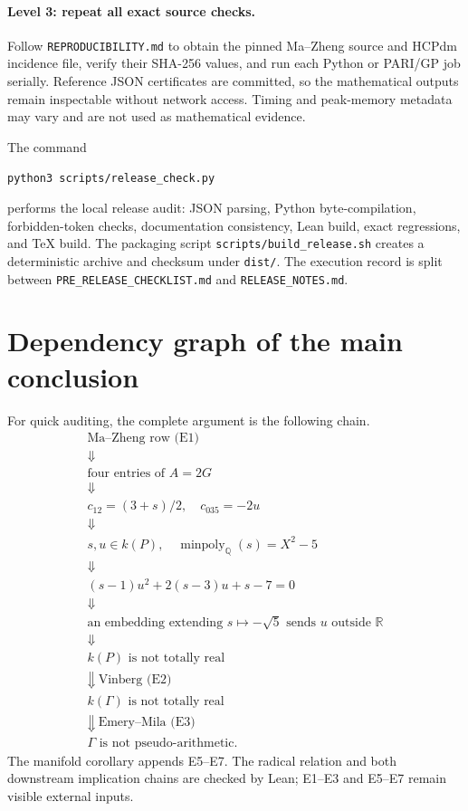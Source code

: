 \documentclass[11pt]{article}
\numberwithin{equation}{section}
\theoremstyle{definition}
\theoremstyle{remark}
\newcommand{\Q}{\mathbb{Q}}
\newcommand{\R}{\mathbb{R}}
\newcommand{\minpoly}{\operatorname{minpoly}}
\newcommand{\code}[1]{\texttt{#1}}
\begin{document}
\paragraph{Level 3: repeat all exact source checks.}
Follow \code{REPRODUCIBILITY.md} to obtain the pinned Ma--Zheng source and
HCPdm incidence file, verify their SHA-256 values, and run each Python or
PARI/GP job serially.  Reference JSON certificates are committed, so the
mathematical outputs remain inspectable without network access.  Timing and
peak-memory metadata may vary and are not used as mathematical evidence.

The command
\begin{center}
\code{python3 scripts/release\_check.py}
\end{center}
performs the local
release audit: JSON parsing, Python byte-compilation, forbidden-token checks,
documentation consistency, Lean build, exact regressions, and TeX build.  The
packaging script \code{scripts/build\_release.sh} creates a deterministic
archive and checksum under \code{dist/}.  The execution record is split
between \code{PRE\_RELEASE\_CHECKLIST.md} and \code{RELEASE\_NOTES.md}.

\appendix

\section{Dependency graph of the main conclusion}
\label{app:dependency}

For quick auditing, the complete argument is the following chain.
\[
\begin{array}{c}
\text{Ma--Zheng row (E1)}\\[2pt]
\Downarrow\\[-2pt]
\text{four entries of }A=2G\\[2pt]
\Downarrow\\[-2pt]
c_{12}=(3+s)/2,\quad c_{035}=-2u\\[2pt]
\Downarrow\\[-2pt]
s,u\in k(P),\quad \minpoly_\Q(s)=X^2-5\\[2pt]
\Downarrow\\[-2pt]
(s-1)u^2+2(s-3)u+s-7=0\\[2pt]
\Downarrow\\[-2pt]
\text{an embedding extending }s\mapsto-\sqrt5\text{ sends }u\text{ outside }\R\\[2pt]
\Downarrow\\[-2pt]
k(P)\text{ is not totally real}\\[2pt]
\Downarrow\ \text{Vinberg (E2)}\\[-2pt]
k(\Gamma)\text{ is not totally real}\\[2pt]
\Downarrow\ \text{Emery--Mila (E3)}\\[-2pt]
\Gamma\text{ is not pseudo-arithmetic}.
\end{array}
\]
The manifold corollary appends E5--E7.  The radical relation and both
downstream implication chains are checked by Lean; E1--E3 and E5--E7 remain
visible external inputs.
\end{document}
